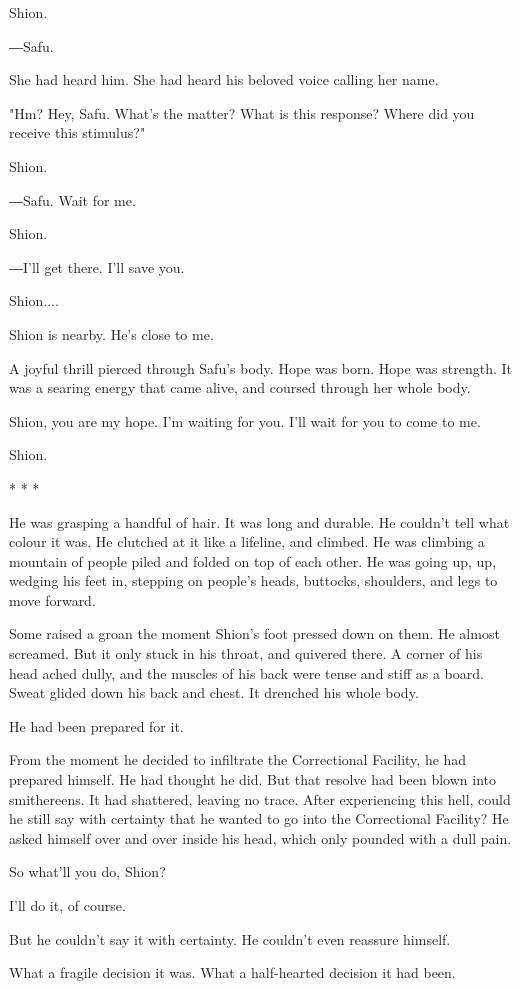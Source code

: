 Shion.

―Safu.

She had heard him. She had heard his beloved voice calling her name.

"Hm? Hey, Safu. What's the matter? What is this response? Where did you
receive this stimulus?"

Shion.

―Safu. Wait for me.

Shion.

―I'll get there. I'll save you.

Shion....

Shion is nearby. He's close to me.

A joyful thrill pierced through Safu's body. Hope was born. Hope was
strength. It was a searing energy that came alive, and coursed through
her whole body.

Shion, you are my hope. I'm waiting for you. I'll wait for you to come
to me.

Shion.

* * *

He was grasping a handful of hair. It was long and durable. He couldn't
tell what colour it was. He clutched at it like a lifeline, and climbed.
He was climbing a mountain of people piled and folded on top of each
other. He was going up, up, wedging his feet in, stepping on people's
heads, buttocks, shoulders, and legs to move forward.

Some raised a groan the moment Shion's foot pressed down on them. He
almost screamed. But it only stuck in his throat, and quivered there. A
corner of his head ached dully, and the muscles of his back were tense
and stiff as a board. Sweat glided down his back and chest. It drenched
his whole body.

He had been prepared for it.

From the moment he decided to infiltrate the Correctional Facility, he
had prepared himself. He had thought he did. But that resolve had been
blown into smithereens. It had shattered, leaving no trace. After
experiencing this hell, could he still say with certainty that he wanted
to go into the Correctional Facility? He asked himself over and over
inside his head, which only pounded with a dull pain.

So what'll you do, Shion?

I'll do it, of course.

But he couldn't say it with certainty. He couldn't even reassure
himself.

What a fragile decision it was. What a half-hearted decision it had
been.

